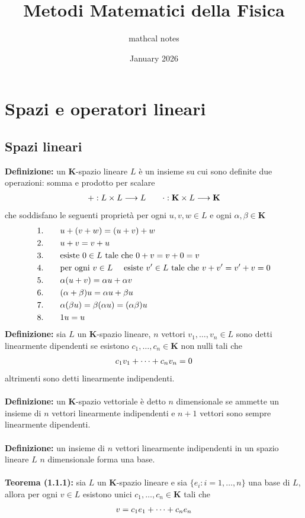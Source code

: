 \documentclass{article}
\title{Metodi Matematici della Fisica}
\author{mathcal notes}
\date{January 2026}
\begin{document}
\maketitle
\tableofcontents
\newpage

\section{Spazi e operatori lineari}
\subsection{Spazi lineari}
\textbf{Definizione:} un $\mathbf{K}$-spazio lineare $L$ è un insieme su cui sono definite due operazioni: somma e prodotto per scalare
\begin{gather}
    + : L \times L \longrightarrow L \qquad \cdot : \mathbf{K} \times L \longrightarrow \mathbf{K} \notag
\end{gather}
che soddisfano le seguenti proprietà per ogni $u, v, w \in L$ e ogni $\alpha, \beta \in \mathbf{K}$
\begin{align}
    1. \qquad &u + (v + w) = (u + v) + w \notag \\
    2. \qquad & u + v = v + u \notag \\
    3. \qquad &\text{esiste } 0 \in L \text{ tale che } 0 + v = v + 0 = v \notag \\
    4. \qquad &\text{per ogni } v \in L \quad \text{ esiste } v' \in L \text{ tale che } v + v' = v' + v = 0 \notag \\
    5. \qquad &\alpha(u + v) = \alpha u + \alpha v \notag \\
    6. \qquad &(\alpha + \beta)u = \alpha u + \beta u \notag \\
    7. \qquad &\alpha(\beta u) = \beta(\alpha u) = (\alpha \beta) u \notag \\
    8. \qquad &1u = u \notag
\end{align}
\textbf{Definizione:} sia $L$ un $\mathbf{K}$-spazio lineare, $n$ vettori $v_1, \dots, v_n \in L$ sono detti linearmente dipendenti se esistono $c_1, \dots, c_n \in \mathbf{K}$ non nulli tali che
\begin{gather}
    c_1v_1 + \dots + c_nv_n = 0 \notag
\end{gather}
altrimenti sono detti linearmente indipendenti. \\ \\
\textbf{Definizione:} un $\mathbf{K}$-spazio vettoriale è detto $n$ dimensionale se ammette un insieme di $n$ vettori linearmente indipendenti e $n + 1$ vettori sono sempre linearmente dipendenti. \\ \\
\textbf{Definizione:} un insieme di $n$ vettori linearmente indipendenti in un spazio lineare $L$ $n$ dimensionale forma una base. \\ \\
\textbf{Teorema (1.1.1):} sia $L$ un $\mathbf{K}$-spazio lineare e sia $\{e_i : i = 1, \dots, n\}$ una base di $L$, allora per ogni $v \in L$ esistono unici $c_1, \dots, c_n \in \mathbf{K}$ tali che
\begin{gather}
    v = c_1e_1 + \dots + c_ne_n \notag
\end{gather}
\end{document}

